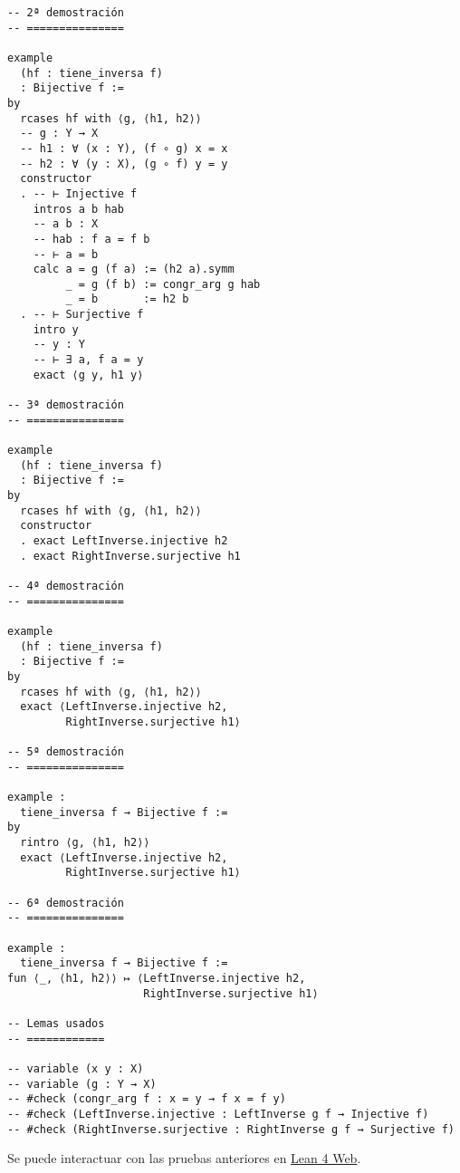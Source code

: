 \begin{verbatim}
-- 2ª demostración
-- ===============

example
  (hf : tiene_inversa f)
  : Bijective f :=
by
  rcases hf with ⟨g, ⟨h1, h2⟩⟩
  -- g : Y → X
  -- h1 : ∀ (x : Y), (f ∘ g) x = x
  -- h2 : ∀ (y : X), (g ∘ f) y = y
  constructor
  . -- ⊢ Injective f
    intros a b hab
    -- a b : X
    -- hab : f a = f b
    -- ⊢ a = b
    calc a = g (f a) := (h2 a).symm
         _ = g (f b) := congr_arg g hab
         _ = b       := h2 b
  . -- ⊢ Surjective f
    intro y
    -- y : Y
    -- ⊢ ∃ a, f a = y
    exact ⟨g y, h1 y⟩

-- 3ª demostración
-- ===============

example
  (hf : tiene_inversa f)
  : Bijective f :=
by
  rcases hf with ⟨g, ⟨h1, h2⟩⟩
  constructor
  . exact LeftInverse.injective h2
  . exact RightInverse.surjective h1

-- 4ª demostración
-- ===============

example
  (hf : tiene_inversa f)
  : Bijective f :=
by
  rcases hf with ⟨g, ⟨h1, h2⟩⟩
  exact ⟨LeftInverse.injective h2,
         RightInverse.surjective h1⟩

-- 5ª demostración
-- ===============

example :
  tiene_inversa f → Bijective f :=
by
  rintro ⟨g, ⟨h1, h2⟩⟩
  exact ⟨LeftInverse.injective h2,
         RightInverse.surjective h1⟩

-- 6ª demostración
-- ===============

example :
  tiene_inversa f → Bijective f :=
fun ⟨_, ⟨h1, h2⟩⟩ ↦ ⟨LeftInverse.injective h2,
                     RightInverse.surjective h1⟩

-- Lemas usados
-- ============

-- variable (x y : X)
-- variable (g : Y → X)
-- #check (congr_arg f : x = y → f x = f y)
-- #check (LeftInverse.injective : LeftInverse g f → Injective f)
-- #check (RightInverse.surjective : RightInverse g f → Surjective f)
\end{verbatim}
Se puede interactuar con las pruebas anteriores en \href{https://lean.math.hhu.de/\#url=https://raw.githubusercontent.com/jaalonso/Calculemus2/main/src/Las\_funciones\_con\_inversa\_son\_biyectivas.lean}{Lean 4 Web}.

